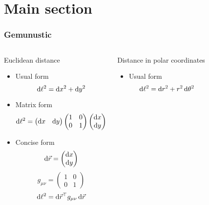 \documentclass[mathserif]{beamer}
\date{}
\author{xdptdr}
\begin{document}
\section{Main section}
\begin{frame}\frametitle{Gemunustic}
\begin{columns}[c]
\begin{block}{Euclidean distance}
\begin{itemize}
\item Usual form
$$\dif \ell^2 = \dif x^2 + \dif y^2$$
\item Matrix form
$$\dif \ell^2 =
\begin{pmatrix}\dif x&\dif y\end{pmatrix}
\begin{pmatrix}1&0\\0&1\end{pmatrix}
\begin{pmatrix}\dif x\\\dif y\end{pmatrix}
$$
\item Concise form
$$\dif\vec r=\begin{pmatrix}\dif x\\\dif y\end{pmatrix}$$
$$g_{\mu\nu}=\begin{pmatrix}1&0\\0&1\end{pmatrix}$$
$$\dif \ell^2 = \dif\vec r^\top g_{\mu\nu} \dif\vec r $$
\end{itemize}
\end{block}
\begin{block}{Distance in polar coordinates}
\begin{itemize}
\item Usual form
$$\dif \ell^2 = \dif r^2 + r^2\dif \theta^2$$
\end{itemize}
\end{block}
\end{columns}
\end{frame}
\end{document}
